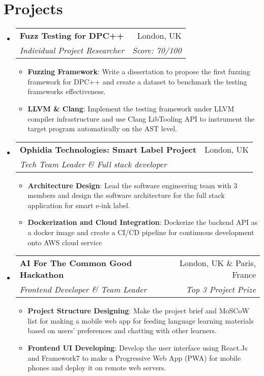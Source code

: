 \documentclass[letterpaper,11pt]{article}
\makeatletter
\newcommand{\resumeItem}[2]{
  \item\small{
    \textbf{#1}{: #2 \vspace{-2pt}}
  }
}
\newcommand{\resumeSubheading}[4]{
  \vspace{-1pt}\item
    \begin{tabular*}{0.97\textwidth}[t]{l@{\extracolsep{\fill}}r}
      \textbf{#1} & #2 \\
      \textit{\small#3} & \textit{\small #4} \\
    \end{tabular*}\vspace{-5pt}
}
\newcommand{\resumeSubHeadingListStart}{\begin{itemize}[leftmargin=*]}
\newcommand{\resumeSubHeadingListEnd}{\end{itemize}}
\newcommand{\resumeItemListStart}{\begin{itemize}[leftmargin=*]}
\newcommand{\resumeItemListEnd}{\end{itemize}\vspace{-5pt}}
\makeatother
\begin{document}
\section{Projects}
  \resumeSubHeadingListStart
    \resumeSubheading
    {Fuzz Testing for DPC++}{London, UK}
    {Individual Project Researcher}{Score: 70/100}
    \resumeItemListStart
      \resumeItem{Fuzzing Framework}
          {Write a dissertation to propose the first fuzzing framework for DPC++ and create a dataset to benchmark the testing frameworks effectiveness.}
      \resumeItem{LLVM \& Clang}
          {Implement the testing framework under LLVM compiler infrastructure and use Clang LibTooling API to instrument the target program automatically on the AST level.}
    \resumeItemListEnd
    \resumeSubheading
    {Ophidia Technologies: Smart Label Project}{London, UK}
    {Tech Team Leader \& Full stack developer}{}
    \resumeItemListStart
      \resumeItem{Architecture Design}
          {Lead the software engineering team with 3 members and design the software architecture for the full stack application for smart e-ink label.}
      \resumeItem{Dockerization and Cloud Integration}
          {Dockerize the backend API as a docker image and create a CI/CD pipeline for continuous development onto AWS cloud service}
    \resumeItemListEnd

    \resumeSubheading
    {AI For The Common Good Hackathon}{London, UK \& Paris, France}
    {Frontend Developer \& Team Leader}{Top 3 Project Prize}
    \resumeItemListStart
      \resumeItem{Project Structure Designing}
          {Make the project brief and MoSCoW list for making a mobile web app for feeding language learning materials based on users' preferences and chatting with other learners.}
      \resumeItem{Frontend UI Developing}
          {Develop the user interface using React.Js and Framework7
          to make a Progressive Web App (PWA) for mobile phones and deploy it on remote web servers.}
    \resumeItemListEnd

  \resumeSubHeadingListEnd

\end{document}
